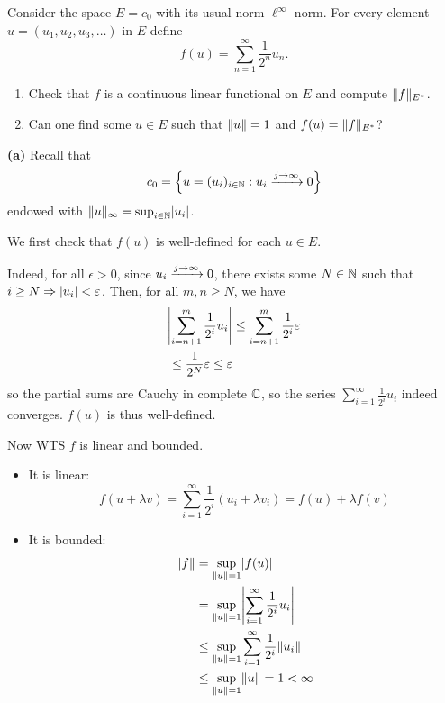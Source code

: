 \documentclass[a4paper, 10pt]{article}
\begin{document}
\begin{problem} 
    Consider the space $E = c_0$ with its usual norm $\ell^\infty$ norm. For every element $u = (u_1, u_2, u_3, \ldots)$ in $E$ define \begin{equation*}
    f(u) = \sum_{n=1}^{\infty} \frac{1}{2^n} u_n.
    \end{equation*}
    \begin{enumerate}
    \item Check that $f$ is a continuous linear functional on $E$ and compute $\norm{f}_{E^*}$.
    \item Can one find some $u \in E$ such that $\norm{u} = 1$ and $f(u) = \norm{f}_{E^*}$?
    \end{enumerate}
\end{problem}
\begin{solution}
    \textbf{(a)} Recall that \begin{equation*}
    c_0 = \left\{u = (u_i)_{i \in \bbn} : u_i \cvgi 0\right\}
    \end{equation*}
    endowed with $\norm{u}_{\infty} = \sup_{i \in \bbn} \abs{u_i}$.

    We first check that $f(u)$ is well-defined for each $u \in E$.
    
    Indeed, for all $\epsilon > 0$, since $u_i \cvgi 0$, there exists some $N \in \bbn$ such that $i \geq N \implies \abs{u_i} < \epsilon$. Then, for all $m, n \geq N$, we have 
    \begin{align*}
    \abs*{\sum_{i=n+1}^{m} \frac{1}{2^i}u_i} &\leq \sum_{i=n+1}^{m} \frac{1}{2^i}\epsilon\\
    \leq \frac{1}{2^N} \epsilon \leq \epsilon
    \end{align*}
    so the partial sums are Cauchy in complete $\bbc$, so the series $\sum_{i=1}^{\infty} \frac{1}{2^i} u_i$ indeed converges. $f(u)$ is thus well-defined.

    Now WTS $f$ is linear and bounded.
    \begin{itemize}
        \item It is linear:
        \begin{equation*}
            f(u + \lambda v) = \sum_{i=1}^{\infty} \frac{1}{2^i} (u_i + \lambda v_i) = f(u) + \lambda f(v)
        \end{equation*}
        \item It is bounded:
        \begin{align*}
        \norm{f} &= \sup_{\norm{u} = 1} \abs{f(u)} \\
        &= \sup_{\norm{u} = 1} \abs*{\sum_{i=1}^{\infty} \frac{1}{2^i} u_i} \\
        &\leq \sup_{\norm{u} = 1} \sum_{i=1}^{\infty} \frac{1}{2^i} \norm{u_i} \\
        &\leq \sup_{\norm{u} = 1} \norm{u} = 1  < \infty
        \end{align*}
    \end{itemize}
    

\end{solution}
\end{document}
